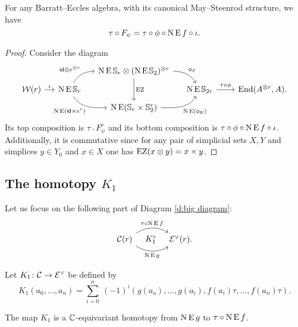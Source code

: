 \begin{lemma}\label{l:K0}
	For any Barratt--Eccles algebra, with its canonical May--Steenrod structure, we have
	\[
	\tau \mathbin{\circ} F_\psi = \tau \mathbin{\circ} \phi \mathbin{\circ} \operatorname{N}\operatorname{E} f \mathbin{\circ} \iota.
	\]
\end{lemma}

\begin{proof}
	Consider the diagram
	\begin{equation*}\label{d:F and f}
		\begin{tikzcd}[column sep=small,row sep=tiny]
			&& \chains\EE\sym_r \ot (\chains\EE\sym_2)^{\ot r}
			\arrow[dr,"\bcirc_{\BE}",out=0,in=120]
			\arrow[dd,"\EZ"] &&[10pt] \\
			\cW(r) \arrow[r,"\iota"] &
			\chains\EE\sym_r
			\arrow[ur,"\id \ot e^{\ot r}", out=60,in=180]
			\arrow[dr,"\chains\EE(\id \times e^r)"',out=-60,in=180]
			& & \chains\EE\sym_{2r} \arrow[r,"\tau\comp\phi"] &
			\End(A^{\ot r}, A). \\
			&& \chains\EE(\sym_r \times \sym_2^r)
			\arrow[ur, "\chains\EE(\bcirc_{\EE})"', out=0,in=-120]
			&
		\end{tikzcd}
	\end{equation*}
	Its top composition is $\tau \comp F_\psi^r$ and its bottom composition is $\tau \mathbin{\circ} \phi \mathbin{\circ} \operatorname{N}\operatorname{E} f \mathbin{\circ} \iota$.
	Additionally, it is commutative since for any pair of simplicial sets $X,Y$ and simplices $y \in Y_0$ and $x \in X$ one has $\operatorname{EZ}(x \otimes y) = x \times y$.
\end{proof}

\subsection{The homotopy $K_1$}\label{ss:K1}

Let us focus on the following part of Diagram \eqref{d:big diagram}:
\[
\begin{tikzcd}[column sep=large]
	\cC(r)
	\arrow[r,bend left,"\tau \comp \chains\EE f"]
	\arrow[r,bend right,"\chains\EE g"']
	\arrow[r,phantom,"K_1^r"]
	& \BE^\vee(r).
\end{tikzcd}
\]

\begin{definition}
	Let $K_1 \colon \mathcal{C} \to \mathcal{E}^\vee$ be defined by
	\[
	K_1(a_0,\dots,a_n) =
	\sum_{i=0}^n \ (-1)^i (g(a_o), \dots, g(a_i), f(a_i) \tau, \dots, f(a_n) \tau).
	\]
\end{definition}

\begin{lemma}\label{l:K1}
	The map $K_1$ is a $\mathbb{C}$-equivariant homotopy from $\operatorname{N} \operatorname{E} g$ to $\tau \mathbin{\circ} \operatorname{N} \operatorname{E} f$.
\end{lemma}

